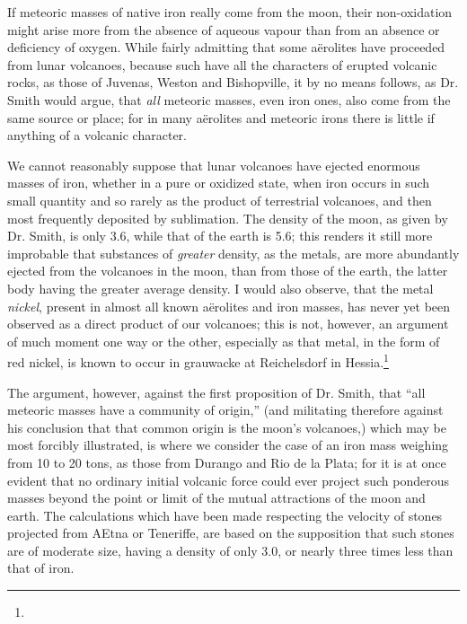 \documentclass[a4paper, 12pt, oneside]{article}
\begin{document}
If meteoric masses of native iron really come from the moon, their non-oxidation might arise more from the absence of aqueous vapour than from an absence or deficiency of oxygen. While fairly admitting that some aërolites have proceeded from lunar volcanoes, because such have all the characters of erupted volcanic rocks, as those of Juvenas, Weston and Bishopville, it by no means follows, as Dr. Smith would argue, that \emph{all} meteoric masses, even iron ones, also come from the same source or place; for in many aërolites and meteoric irons there is little if anything of a volcanic character.

We cannot reasonably suppose that lunar volcanoes have ejected enormous masses of iron, whether in a pure or oxidized state, when iron occurs in such small quantity and so rarely as the product of terrestrial volcanoes, and then most frequently deposited by sublimation. The density of the moon, as given by Dr. Smith, is only 3.6, while that of the earth is 5.6; this renders it still more improbable that substances of \emph{greater} density, as the metals, are more abundantly ejected from the volcanoes in the moon, than from those of the earth, the latter body having the greater average density. I would also observe, that the metal \emph{nickel}, present in almost all known aërolites and iron masses, has never yet been observed as a direct product of our volcanoes; this is not, however, an argument of much moment one way or the other, especially as that metal, in the form of red nickel, is known to occur in grauwacke at Reichelsdorf in Hessia.\footnote{}

The argument, however, against the first proposition of Dr. Smith, that ``all meteoric masses have a community of origin,'' (and militating therefore against his conclusion that that common origin is the moon's volcanoes,) which may be most forcibly illustrated, is where we consider the case of an iron mass weighing from 10 to 20 tons, as those from Durango and Rio de la Plata; for it is at once evident that no ordinary initial volcanic force could ever project such ponderous masses beyond the point or limit of the mutual attractions of the moon and earth. The calculations which have been made respecting the velocity of stones projected from AEtna or Teneriffe, are based on the supposition that such stones are of moderate size, having a density of only 3.0, or nearly three times less than that of iron.
\end{document}
